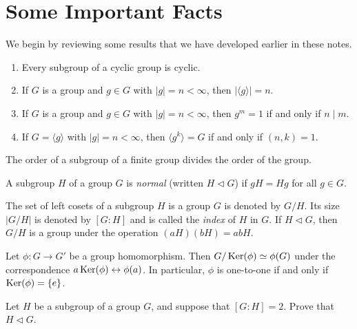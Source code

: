 \section{Some Important Facts}

We begin by reviewing some results that we have developed earlier in these notes.

\begin{theorem} \mbox{}
 \begin{enumerate}\renewcommand{\theenumi}{\alph{enumi}}
  \item
        Every subgroup of a cyclic group is cyclic.
  \item
        If $G$ is a group and $g\in G$ with $|g|=n<\infty$, then $|\langle g \rangle|=n$.
  \item
        If $G$ is a group and $g\in G$ with $|g|=n<\infty$, then $g^m = 1$ if and only if $n \mid m$.
  \item
        If $G = \langle g \rangle$ with $|g|=n<\infty$, then $\langle g^k \rangle = G$  if and only if $(n,k)=1$.
 \end{enumerate}
\end{theorem}

\begin{theorem}[Lagrange]
 The order of a subgroup of a finite group divides the order of the group.
\end{theorem}

\begin{definition}
 A subgroup $H$ of a group $G$ is \textit{normal} (written $H\lhd G$) if $gH = Hg$ for all $g\in G$.
\end{definition}

\begin{theorem}
 The set of left cosets of a subgroup $H$ is a group $G$ is denoted by $G/H$. Its size $|G/H|$ is denoted by $[G:H]$ and is called the \emph{index} of $H$ in $G$.
 If $H\lhd G$, then $G/H$ is a group under the operation $(aH)(bH)=abH$.
\end{theorem}

\begin{theorem}
 Let $\phi:G \longrightarrow G'$ be a group homomorphism. Then $G/\operatorname{Ker}(\phi) \simeq \phi(G)$ under the correspondence $a\operatorname{Ker}(\phi) \leftrightarrow \phi(a)$. In particular, $\phi$ is one-to-one if and only if $\operatorname{Ker}(\phi) = \{e\}$.
\end{theorem}

\begin{problem}\label{prob:index2norm}
Let $H$ be a subgroup of a group $G$, and suppose that $[G : H] = 2$.  Prove that $H \lhd G$.
\begin{annotation}
\end{annotation}
\end{problem}

